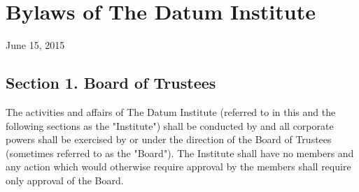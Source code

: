 \section{Bylaws of The Datum Institute}

June 15, 2015

\subsection{Section 1. Board of Trustees}

The activities and affairs of The Datum Institute (referred to in this and the following sections as the "Institute") shall be conducted by and all corporate powers shall be exercised by or under the direction of the Board of Trustees (sometimes referred to as the "Board"). The Institute shall have no members and any action which would otherwise require approval by the members shall require only approval of the Board.
